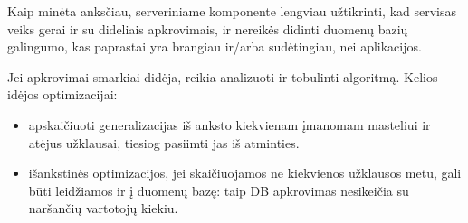 \documentclass{article}
\begin{document}
Kaip minėta anksčiau, serveriniame komponente lengviau užtikrinti, kad servisas
veiks gerai ir su dideliais apkrovimais, ir nereikės didinti duomenų bazių
galingumo, kas paprastai yra brangiau ir/arba sudėtingiau, nei aplikacijos.

Jei apkrovimai smarkiai didėja, reikia analizuoti ir tobulinti algoritmą.
Kelios idėjos optimizacijai:

\begin{itemize}

    \item apskaičiuoti generalizacijas iš anksto kiekvienam įmanomam masteliui
        ir atėjus užklausai, tiesiog pasiimti jas iš atminties.

    \item išankstinės optimizacijos, jei skaičiuojamos ne kiekvienos užklausos
        metu, gali būti leidžiamos ir į duomenų bazę: taip DB apkrovimas
        nesikeičia su naršančių vartotojų kiekiu.

\end{itemize}
\end{document}
